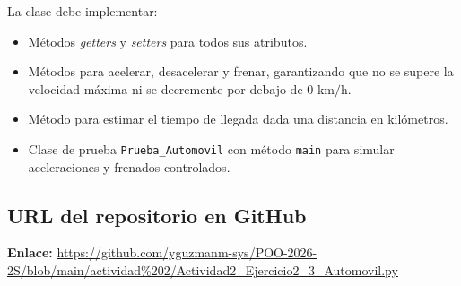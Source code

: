 \documentclass[11pt,a4paper]{article}
\begin{document}
La clase debe implementar:
\begin{itemize}
    \item Métodos \textit{getters} y \textit{setters} para todos sus atributos.
    \item Métodos para acelerar, desacelerar y frenar, garantizando que no se supere la velocidad máxima ni se decremente por debajo de $0\text{ km/h}$.
    \item Método para estimar el tiempo de llegada dada una distancia en kilómetros.
    \item Clase de prueba \texttt{Prueba\_Automovil} con método \texttt{main} para simular aceleraciones y frenados controlados.
\end{itemize}

\subsection{URL del repositorio en GitHub}
\noindent \textbf{Enlace:} \url{https://github.com/yguzmanm-sys/POO-2026-2S/blob/main/actividad%202/Actividad2_Ejercicio2_3_Automovil.py}
\end{document}
